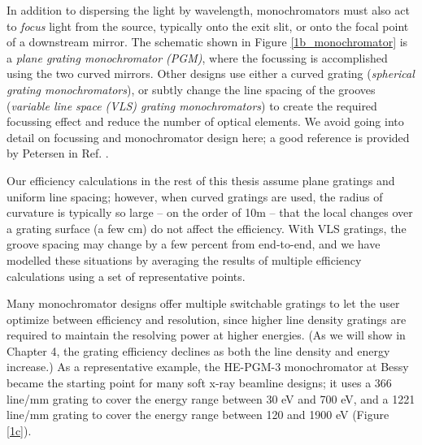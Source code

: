 In addition to dispersing the light by wavelength, monochromators must also act to \emph{focus} light from the source, typically onto the exit slit, or onto the focal point of a downstream mirror.  The schematic shown in Figure \ref{1b_monochromator} is a \emph{plane grating monochromator (PGM)}, where the focussing is accomplished using the two curved mirrors.  Other designs use either a curved grating (\emph{spherical grating monochromators}), or subtly change the line spacing of the grooves (\emph{variable line space (VLS) grating monochromators}) to create the required focussing effect and reduce the number of optical elements.  We avoid going into detail on focussing and monochromator design here; a good reference is provided by Petersen in Ref. \cite{Pea97}.

Our efficiency calculations in the rest of this thesis assume plane gratings and uniform line spacing; however, when curved gratings are used, the radius of curvature is typically so large  -- on the order of 10m -- that the local changes over a grating surface (a few cm) do not affect the efficiency.  With VLS gratings, the groove spacing may change by a few percent from end-to-end, and we have modelled these situations by averaging the results of multiple efficiency calculations using a set of representative points.

Many monochromator designs offer multiple switchable gratings to let the user optimize between efficiency and resolution, since higher line density gratings are required to maintain the resolving power at higher energies.  (As we will show in Chapter 4, the grating efficiency declines as both the line density and energy increase.)  As a representative example, the HE-PGM-3 monochromator at Bessy \cite{Pet95} became the starting point for many soft x-ray beamline designs; it uses a 366 line/mm grating to cover the energy range between 30 eV and 700 eV, and a 1221 line/mm grating to cover the energy range between 120 and 1900 eV (Figure \ref{1c}).


